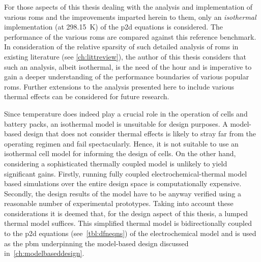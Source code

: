 For those aspects of this thesis dealing with the analysis and implementation of
various  \glspl{rom} and  the  improvements  imparted herein  to  them, only  an
\emph{isothermal}  implementation  (at  \SI{298.15}{\kelvin}) of  the  \gls{p2d}
equations  is  considered.  The  performance  of  the  various  \glspl{rom}  are
compared  against this  reference benchmark.  In consideration  of the  relative
sparsity of  such detailed analysis  of \glspl{rom} in existing  literature (see
\cref{ch:littreview}),  the  author  of  this  thesis  considers  that  such  an
analysis, albeit isothermal, is  the need of the hour and  is imperative to gain
a  deeper  understanding  of  the  performance  boundaries  of  various  popular
\glspl{rom}.  Further  extensions to  the  analysis  presented here  to  include
various thermal effects can be considered for future research.

Since temperature does indeed play a crucial  role in the operation of cells and
battery  packs,  an  isothermal  model  is unsuitable  for  design  purposes.  A
model-based design that does not consider thermal effects is likely to stray far
from the operating regimen and fail  spectacularly. Hence, it is not suitable to
use an  isothermal cell model  for informing the design  of cells. On  the other
hand, considering a  sophisticated thermally coupled model is  unlikely to yield
significant gains. Firstly, running  fully coupled electrochemical-thermal model
based simulations  over the  entire design  space is  computationally expensive.
Secondly,  the design  results of  the model  have to  be anyway  verified using
a  reasonable  number of  experimental  prototypes.  Taking into  account  these
considerations it is deemed that, for the design aspect of this thesis, a lumped
thermal model suffices. This simplified thermal model is bidirectionally coupled
to the \gls{p2d} equations (see~\cref{tbl:dfneqns}) of the electrochemical model
and  is used  as the  \gls{pbm}  underpinning the  model-based design  discussed
in~\cref{ch:modelbaseddesign}.






